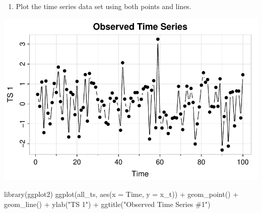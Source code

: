 \documentclass[
  letterpaper,
  DIV=11,
  numbers=noendperiod]{scrartcl}
\newenvironment{Shaded}{\begin{snugshade}}{\end{snugshade}}
\newcommand{\AttributeTok}[1]{\textcolor[rgb]{0.40,0.45,0.13}{#1}}
\newcommand{\DecValTok}[1]{\textcolor[rgb]{0.68,0.00,0.00}{#1}}
\newcommand{\FunctionTok}[1]{\textcolor[rgb]{0.28,0.35,0.67}{#1}}
\newcommand{\NormalTok}[1]{\textcolor[rgb]{0.00,0.23,0.31}{#1}}
\newcommand{\OtherTok}[1]{\textcolor[rgb]{0.00,0.23,0.31}{#1}}
\newcommand{\SpecialCharTok}[1]{\textcolor[rgb]{0.37,0.37,0.37}{#1}}
\newcommand{\StringTok}[1]{\textcolor[rgb]{0.13,0.47,0.30}{#1}}
\providecommand{\tightlist}{%
  \setlength{\itemsep}{0pt}\setlength{\parskip}{0pt}}\usepackage{longtable,booktabs,array}
\begin{document}
\begin{Shaded}
\end{Shaded}

\begin{enumerate}
\def\labelenumi{\arabic{enumi}.}
\setcounter{enumi}{1}
\tightlist
\item
  Plot the time series data set using both points and lines.
\end{enumerate}

\begin{Shaded}
\end{Shaded}

\includegraphics{Lecture7_files/figure-pdf/astsa_act2_part2-1.pdf}

\begin{Shaded}
\begin{Highlighting}[]
\FunctionTok{library}\NormalTok{(ggplot2)}
\FunctionTok{ggplot}\NormalTok{(all\_ts, }\FunctionTok{aes}\NormalTok{(}\AttributeTok{x =}\NormalTok{ Time, }\AttributeTok{y =}\NormalTok{ x\_t)) }\SpecialCharTok{+} \FunctionTok{geom\_point}\NormalTok{() }\SpecialCharTok{+} \FunctionTok{geom\_line}\NormalTok{() }\SpecialCharTok{+} \FunctionTok{ylab}\NormalTok{(}\StringTok{"TS 1"}\NormalTok{) }\SpecialCharTok{+} \FunctionTok{ggtitle}\NormalTok{(}\StringTok{"Observed Time Series \#1"}\NormalTok{)}
\end{Highlighting}
\end{Shaded}
\end{document}
